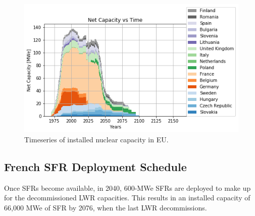 \begin{figure}[htbp!]
	\begin{center}
		\includegraphics[scale=0.7]{./images/eu_future/power_plot.png}
	\end{center}
	\caption{Timeseries of installed nuclear capacity in \gls{EU}.}
	\label{fig:eu_pow}
\end{figure}
\FloatBarrier

\subsection{French \gls{SFR} Deployment Schedule}

Once \glspl{SFR} become available, in 2040,
600-MWe \glspl{SFR} are deployed to make up for the 
decommissioned \gls{LWR} capacities. 
This results in an installed capacity of 66,000 MWe
of \gls{SFR} by 2076, when the last \gls{LWR} decommissions.

